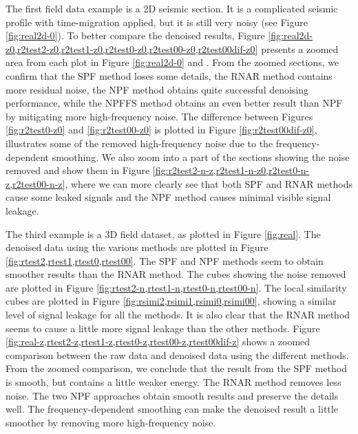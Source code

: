 The first field data example is a 2D seismic section. It is a complicated seismic profile with time-migration applied, but it is still very noisy (see Figure \ref{fig:real2d-0}). To better compare the denoised results, Figure \ref{fig:real2d-z0,r2test2-z0,r2test1-z0,r2test0-z0,r2test00-z0,r2test00dif-z0} presents a zoomed area from each plot in Figure \ref{fig:real2d-0} and . From the zoomed sections, we confirm that the SPF method loses some details, the RNAR method contains more residual noise, the NPF method obtains quite successful denoising performance, while the NPFFS method obtains an even better result than NPF by mitigating more high-frequency noise. The difference between Figures \ref{fig:r2test0-z0} and \ref{fig:r2test00-z0} is plotted in Figure \ref{fig:r2test00dif-z0}, illustrates some of the removed high-frequency noise due to the frequency-dependent smoothing. We also zoom into a part of the sections showing the noise removed and show them in Figure \ref{fig:r2test2-n-z,r2test1-n-z0,r2test0-n-z,r2test00-n-z}, where we can more clearly see that both SPF and RNAR methods cause some leaked signals and the NPF method causes minimal visible signal leakage. 

The third example is a 3D field dataset, as plotted in Figure \ref{fig:real}. The denoised data using the various methods are plotted in Figure \ref{fig:rtest2,rtest1,rtest0,rtest00}. The SPF and NPF methods seem to obtain smoother results than the RNAR method. The cubes showing the noise removed are plotted in Figure \ref{fig:rtest2-n,rtest1-n,rtest0-n,rtest00-n}. The local similarity cubes are plotted in Figure \ref{fig:rsimi2,rsimi1,rsimi0,rsimi00}, showing 
 a similar level of signal leakage for all the methods. It is also clear that the RNAR method seems to cause a little more signal leakage than the other methods. Figure \ref{fig:real-z,rtest2-z,rtest1-z,rtest0-z,rtest00-z,rtest00dif-z} shows a zoomed comparison between the raw data and denoised data using the different methods. From the zoomed comparison, we conclude that the result from the SPF method is smooth, but contains a little weaker energy. The RNAR method removes less noise. The two NPF approaches obtain smooth results and preserve the details well. The frequency-dependent smoothing can make the denoised result a little smoother by removing more high-frequency noise. 


